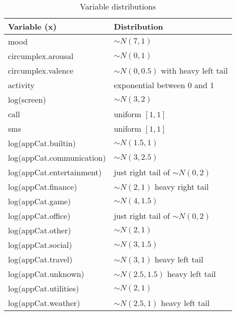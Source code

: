 \begin{table}[H]
\centering
\begin{tabular}{|l|l|}
\hline
\textbf{Variable (x)}   & \textbf{Distribution}                              \\ \hline
mood                     & $\sim N(7, 1)$                                      \\ \hline
circumplex.arousal       & $\sim N(0, 1)$                                      \\ \hline
circumplex.valence       & $\sim N(0, 0.5)$ with heavy left tail               \\ \hline
activity                 & exponential between 0 and 1                         \\ \hline
log(screen)              & $\sim N(3, 2)$                                      \\ \hline
call                     & uniform $[1, 1]$                                    \\ \hline
sms                      & uniform $[1, 1]$                                    \\ \hline
log(appCat.builtin)      & $\sim N(1.5, 1)$                                    \\ \hline
log(appCat.communication)& $\sim N(3, 2.5)$                                   \\ \hline
log(appCat.entertainment)& just right tail of $\sim N(0, 2)$                   \\ \hline
log(appCat.finance)      & $\sim N(2, 1)$ heavy right tail                     \\ \hline
log(appCat.game)         & $\sim N(4, 1.5)$                                    \\ \hline
log(appCat.office)       & just right tail of $\sim N(0, 2)$                   \\ \hline
log(appCat.other)        & $\sim N(2, 1)$                                      \\ \hline
log(appCat.social)       & $\sim N(3, 1.5)$                                    \\ \hline
log(appCat.travel)       & $\sim N(3, 1)$ heavy left tail                      \\ \hline
log(appCat.unknown)      & $\sim N(2.5, 1.5)$ heavy left tail                  \\ \hline
log(appCat.utilities)    & $\sim N(2, 1)$                                      \\ \hline
log(appCat.weather)      & $\sim N(2.5, 1)$ heavy left tail                    \\ \hline
\end{tabular}
\caption{Variable distributions}
\end{table}
